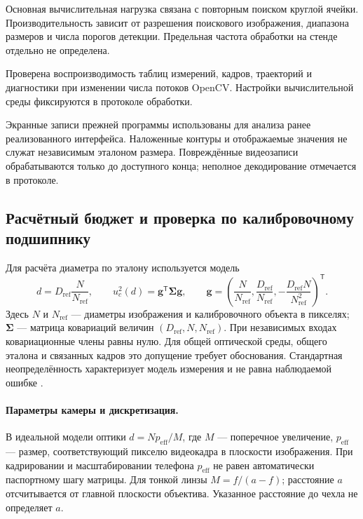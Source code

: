 \documentclass[12pt,a4paper]{article}
\begin{document}
Основная вычислительная нагрузка связана с повторным поиском круглой ячейки. Производительность зависит от разрешения поискового изображения, диапазона размеров и числа порогов детекции. Предельная частота обработки на стенде отдельно не определена.

Проверена воспроизводимость таблиц измерений, кадров, траекторий и диагностики при изменении числа потоков OpenCV. Настройки вычислительной среды фиксируются в протоколе обработки.

Экранные записи прежней программы использованы для анализа ранее реализованного интерфейса. Наложенные контуры и отображаемые значения не служат независимым эталоном размера. Повреждённые видеозаписи обрабатываются только до доступного конца; неполное декодирование отмечается в протоколе.

\subsection{Расчётный бюджет и проверка по калибровочному подшипнику}
Для расчёта диаметра по эталону используется модель
\[
 d=D_{\mathrm{ref}}\frac{N}{N_{\mathrm{ref}}},\qquad
 u_c^2(d)=\mathbf g^{\mathsf T}\boldsymbol\Sigma\mathbf g,\qquad
 \mathbf g=\left(\frac{N}{N_{\mathrm{ref}}},\frac{D_{\mathrm{ref}}}{N_{\mathrm{ref}}},-\frac{D_{\mathrm{ref}}N}{N_{\mathrm{ref}}^2}\right)^{\mathsf T}.
\]
Здесь $N$ и $N_{\mathrm{ref}}$ --- диаметры изображения и калибровочного объекта в пикселях; $\boldsymbol\Sigma$ --- матрица ковариаций величин $(D_{\mathrm{ref}},N,N_{\mathrm{ref}})$. При независимых входах ковариационные члены равны нулю. Для общей оптической среды, общего эталона и связанных кадров это допущение требует обоснования. Стандартная неопределённость характеризует модель измерения и не равна наблюдаемой ошибке \cite{gum}.

\paragraph{Параметры камеры и дискретизация.}
В идеальной модели оптики $d=Np_{\mathrm{eff}}/M$, где $M$ --- поперечное увеличение, $p_{\mathrm{eff}}$ --- размер, соответствующий пикселю видеокадра в плоскости изображения. При кадрировании и масштабировании телефона $p_{\mathrm{eff}}$ не равен автоматически паспортному шагу матрицы. Для тонкой линзы $M=f/(a-f)$; расстояние $a$ отсчитывается от главной плоскости объектива. Указанное расстояние до чехла не определяет $a$.
\end{document}
